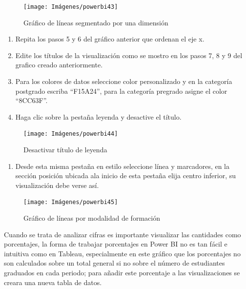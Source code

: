 \documentclass[
]{book}
\providecommand{\tightlist}{%
  \setlength{\itemsep}{0pt}\setlength{\parskip}{0pt}}
\begin{document}
\begin{figure}

{\centering \texttt{[image: Imágenes/powerbi43]} 

}

\caption{Gráfico de líneas segmentado por una dimensión}\label{fig:paso2lineassegmentadobi-fig}
\end{figure}

\begin{enumerate}
\def\labelenumi{\arabic{enumi}.}
\setcounter{enumi}{2}
\item
  Repita los pasos 5 y 6 del gráfico anterior que ordenan el eje x.
\item
  Edite los títulos de la visualización como se mostro en los pasos 7, 8 y 9 del grafico creado anteriormente.
\item
  Para los colores de datos seleccione color personalizado y en la categoría postgrado escriba ``F15A24'', para la categoría pregrado asigne el color ``8CC63F''.
\item
  Haga clic sobre la pestaña leyenda y desactive el título.
\end{enumerate}

\begin{figure}

{\centering \texttt{[image: Imágenes/powerbi44]} 

}

\caption{Desactivar título de leyenda}\label{fig:paso6lineassegmentadobi-fig}
\end{figure}

\begin{enumerate}
\def\labelenumi{\arabic{enumi}.}
\setcounter{enumi}{6}
\tightlist
\item
  Desde esta misma pestaña en estilo seleccione línea y marcadores, en la sección posición ubicada ala inicio de esta pestaña elija centro inferior, su visualización debe verse así.
\end{enumerate}

\begin{figure}

{\centering \texttt{[image: Imágenes/powerbi45]} 

}

\caption{Gráfico de líneas por modalidad de formación}\label{fig:paso7lineassegmentadobi-fig}
\end{figure}

Cuando se trata de analizar cifras es importante visualizar las cantidades como porcentajes, la forma de trabajar porcentajes en Power BI no es tan fácil e intuitiva como en Tableau, especialmente en este gráfico que los porcentajes no son calculados sobre un total general si no sobre el número de estudiantes graduados en cada periodo; para añadir este porcentaje a las visualizaciones se creara una nueva tabla de datos.
\end{document}
